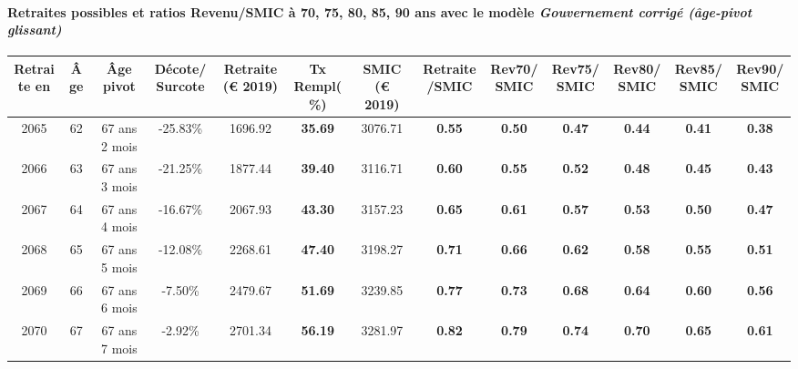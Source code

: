\paragraph{Retraites possibles et ratios Revenu/SMIC à 70, 75, 80, 85, 90 ans avec le modèle \emph{Gouvernement corrigé (âge-pivot glissant)}}  
 
{ \scriptsize \begin{center} 
\begin{tabular}[htb]{|c|c||c|c||c|c||c||c|c|c|c|c|c|} 
\hline 
 Retraite en &  Âge &  Âge pivot &  Décote/Surcote &  Retraite (\euro{} 2019) &  Tx Rempl(\%) &  SMIC (\euro{} 2019) &  Retraite/SMIC &  Rev70/SMIC &  Rev75/SMIC &  Rev80/SMIC &  Rev85/SMIC &  Rev90/SMIC \\ 
\hline \hline 
 2065 &  62 &  67 ans 2 mois &  -25.83\% &  1696.92 &  {\bf 35.69} &  3076.71 &  {\bf {\color{red} 0.55}} &  {\bf {\color{red} 0.50}} &  {\bf {\color{red} 0.47}} &  {\bf {\color{red} 0.44}} &  {\bf {\color{red} 0.41}} &  {\bf {\color{red} 0.38}} \\ 
\hline 
 2066 &  63 &  67 ans 3 mois &  -21.25\% &  1877.44 &  {\bf 39.40} &  3116.71 &  {\bf {\color{red} 0.60}} &  {\bf {\color{red} 0.55}} &  {\bf {\color{red} 0.52}} &  {\bf {\color{red} 0.48}} &  {\bf {\color{red} 0.45}} &  {\bf {\color{red} 0.43}} \\ 
\hline 
 2067 &  64 &  67 ans 4 mois &  -16.67\% &  2067.93 &  {\bf 43.30} &  3157.23 &  {\bf {\color{red} 0.65}} &  {\bf {\color{red} 0.61}} &  {\bf {\color{red} 0.57}} &  {\bf {\color{red} 0.53}} &  {\bf {\color{red} 0.50}} &  {\bf {\color{red} 0.47}} \\ 
\hline 
 2068 &  65 &  67 ans 5 mois &  -12.08\% &  2268.61 &  {\bf 47.40} &  3198.27 &  {\bf {\color{red} 0.71}} &  {\bf {\color{red} 0.66}} &  {\bf {\color{red} 0.62}} &  {\bf {\color{red} 0.58}} &  {\bf {\color{red} 0.55}} &  {\bf {\color{red} 0.51}} \\ 
\hline 
 2069 &  66 &  67 ans 6 mois &  -7.50\% &  2479.67 &  {\bf 51.69} &  3239.85 &  {\bf {\color{red} 0.77}} &  {\bf {\color{red} 0.73}} &  {\bf {\color{red} 0.68}} &  {\bf {\color{red} 0.64}} &  {\bf {\color{red} 0.60}} &  {\bf {\color{red} 0.56}} \\ 
\hline 
 2070 &  67 &  67 ans 7 mois &  -2.92\% &  2701.34 &  {\bf 56.19} &  3281.97 &  {\bf {\color{red} 0.82}} &  {\bf {\color{red} 0.79}} &  {\bf {\color{red} 0.74}} &  {\bf {\color{red} 0.70}} &  {\bf {\color{red} 0.65}} &  {\bf {\color{red} 0.61}} \\ 
\hline 
\hline 
\end{tabular} 
\end{center} } 
